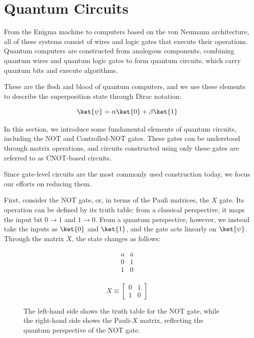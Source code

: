 \section{Quantum Circuits}
From the Enigma machine to computers based on the von Neumann architecture, 
all of these systems consist of wires and logic gates that execute their 
operations. Quantum computers are constructed from analogous components, 
combining quantum wires and quantum logic gates to form quantum circuits, 
which carry quantum bits and execute algorithms.

These are the flesh and blood of quantum computers, and we use these elements to describe the superposition state through Dirac notation:


\begin{equation}
    \ket{\psi} = \alpha\ket{0} + \beta\ket{1}
\end{equation}

In this section, we introduce some fundamental elements of quantum circuits, including the NOT and Controlled-NOT gates. These gates can be understood through matrix operations, and circuits constructed using only these gates are referred to as CNOT-based circuits.

Since gate-level circuits are the most commonly used construction today, we focus our efforts on reducing them.

First, consider the NOT gate, or, in terms of the Pauli matrices, the $X$ gate. Its operation can be defined by its truth table: from a classical perspective, it maps the input bit $0 \rightarrow 1$ and $1 \rightarrow 0$. From a quantum perspective, however, we instead take the inputs as $\ket{0}$ and $\ket{1}$, and the gate acts linearly on $\ket{\psi}$. Through the matrix $X$, the state changes as follows:

\begin{figure}[htbp]
\centering
\begin{minipage}{0.45\textwidth}
\centering
\begin{displaymath}
\begin{array}{c|c}
\hline
a & \bar{a} \\
\hline
0 & 1  \\
1 & 0  \\
\end{array}
\end{displaymath}
\end{minipage}%
\hfill
\begin{minipage}{0.45\textwidth}
\centering
\[
X \equiv \begin{bmatrix} 0 & 1 \\ 1 & 0 \end{bmatrix}
\]
\end{minipage}
\caption{The left-hand side shows the truth table for the NOT gate, while the right-hand side shows the Pauli-$X$ matrix, reflecting the quantum perspective of the NOT gate.}
\label{fig:not-truth-table-and-pauli-x}
\end{figure}

